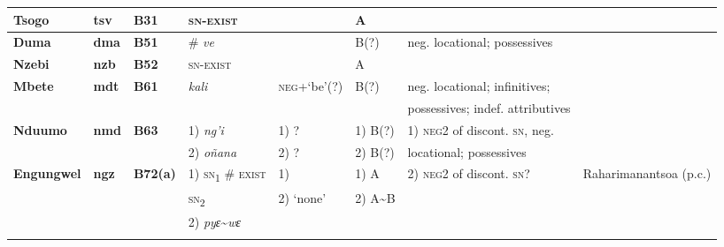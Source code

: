 \documentclass[output=paper]{langscibook}
\begin{document}
\begin{sidewaystable}[p]
\begin{scriptsize}
\begin{tabularx}{\textwidth}{llllllll}
\textbf{Tsogo}	&\textbf{tsv}		&\textbf{B31} 	&\textsc{sn-exist}	&\textendash								&A 		& 									&\citet{Marchal1979}\\\midrule
\textbf{Duma}	&\textbf{dma}	&\textbf{B51}	&\# \textit{ve}	&\textendash								&B(?)	&neg. locational; possessives 			&\citet{Adam1954}\\\midrule
\textbf{Nzebi}	&\textbf{nzb}	&\textbf{B52}	&\textsc{sn-exist}	&\textendash								&A 		& 				 					&\citet{Marchal1987}\\\midrule
\textbf{Mbete} 	&\textbf{mdt} 	&\textbf{B61} 	&\textit{kali} 	&\textsc{neg}+`be'(?) 					&B(?) 	&neg. locational; infinitives;			&\citet{Adam1954}\\
				&				&				&				&										&		&possessives; indef. attributives		&\\\midrule
\textbf{Nduumo} &\textbf{nmd} 	& \textbf{B63} 	&1) \textit{ng'i}	& 1) ?									&1) B(?)	&1) \textsc{neg}2 of discont. \textsc{sn}, neg.	&\citet{Adam1954}\\
				&				&				&2) \textit{o\~n{}ana} &2) ?									&2) B(?)	&locational; possessives 				&\\\midrule
\textbf{Engungwel} & \textbf{ngz} &\textbf{B72(a)} 	&1) \textsc{sn}\textsubscript{1} \# \textsc{exist}& 1) \textendash	&1) A&2) \textsc{neg}2 of discont. \textsc{sn}?&Raharimanantsoa (p.c.)\\
				&				&				&\textsc{sn}\textsubscript{2}&2) `none'							&2) A{\textasciitilde}B&						&\\
				&				&				&2) \textit{pyɛ}{\textasciitilde}\textit{wɛ}&					&		&									&\\
\lspbottomrule
\end{tabularx}\end{scriptsize}
\end{sidewaystable}
\end{document}
